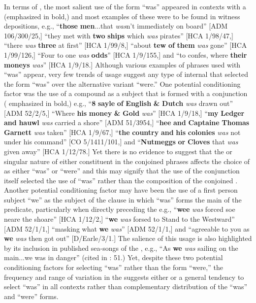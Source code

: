 In terms of , the most salient use of the  form “was” appeared in   contexts with a  (emphasized in bold,) and most examples of these were to be found in witness depositions, e.g., “\textbf{those} \textbf{men}...that \textit{was}n't immediately on board” [ADM 106/300/25,] “they met with \textbf{two} \textbf{ships} which \textit{was} pirates” [HCA 1/98/47,] “there \textit{was} \textbf{three} at first” [HCA 1/99/8,] “about \textbf{tew} \textbf{of} \textbf{them} \textit{was} gone” [HCA 1/99/126,] “Four to one \textit{was} \textbf{odds}” [HCA 1/9/155,] and “to confes, where \textbf{their} \textbf{moneys} \textit{was}” [HCA 1/9/18.] Although various examples of    phrases used with “was” appear, very few trends of usage suggest any type of internal  that selected the  form “was” over the alternative variant “were.”  One potential conditioning factor was the use of a compound  as a subject that is formed with a conjunction ( emphasized in bold,) e.g., “\textbf{8} \textbf{sayle} \textbf{of} \textbf{English} \textbf{\&}  \textbf{Dutch} \textit{was} drawn out” [ADM 52/2/5,] “Where \textbf{his} \textbf{money} \textbf{\&}  \textbf{Gold} \textit{was}” [HCA 1/9/18,] “\textbf{my} \textbf{Ledger} \textbf{and} \textbf{hauwl} \textit{was} carried a shore” [ADM 51/3954,] “\textbf{hee} \textbf{and} \textbf{Captaine} \textbf{Thomas} \textbf{Garnett} \textit{was} taken” [HCA 1/9/67,] “\textbf{the} \textbf{country} \textbf{and} \textbf{his} \textbf{colonies} \textit{was} not under his command” [CO 5/1411/101,] and “\textbf{Nutmeggs} \textbf{or} \textbf{Cloves} that \textit{was} given away” [HCA 1/12/78.] Yet there is no evidence to suggest that the  or singular nature of either constituent in the conjoined  phrases affects the choice of   as either “was” or “were” and this may signify that the use of the conjunction itself selected the use of “was” rather than the composition of the conjoined . Another potential conditioning factor may have been the use of a first person   subject “we” as the subject of the clause in which “was” forms the main  of the predicate, particularly when directly preceding the  e.g., “\textbf{wee} \textit{was} forced soe neare the shoare” [HCA 1/12/2,] “\textbf{we} \textit{was} forsed to Stand to the Westward” [ADM 52/1/1,] “masking what \textbf{we} \textit{was}” [ADM 52/1/1,] and “agreeable to you as \textbf{we} \textit{was} then got out” [D/Earle/3/1.] The salience of this usage is also highlighted by its inclusion in published sea-songs of the , e.g., “As \textbf{we} \textit{was} sailing on the main...we was in danger” (cited in \citealt{Palmer1986}: 51.) Yet, despite these two potential conditioning factors for selecting “was” rather than the  form “were,” the frequency and range of variation in the  suggests either  or a general tendency to select “was” in all contexts rather than complementary distribution of the “was” and “were” forms. 

